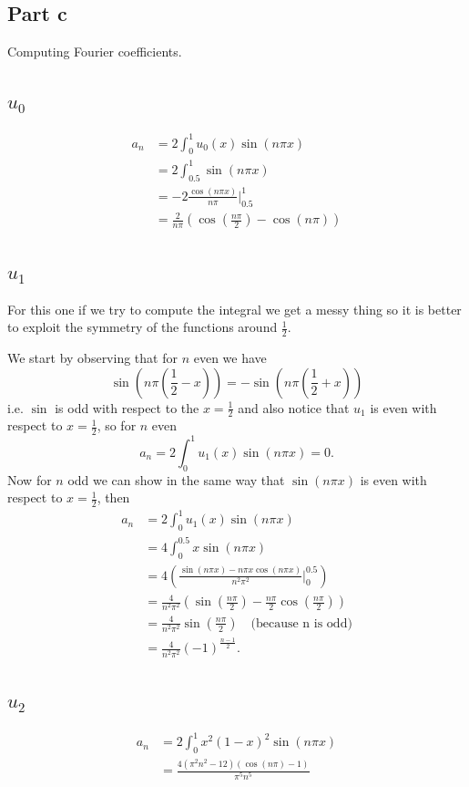\documentclass{article}
\begin{document}
\subsection{Part c}
Computing Fourier coefficients.
\subsection{$u_0$}
\begin{align*}
	a_n&=2\int_0^1 u_0(x)\sin(n\pi x)\\
	  &=2\int_{0.5}^1\sin(n\pi x)\\
	  &= -2\frac{\cos(n\pi x)}{n\pi}\Big|_{0.5}^1\\
	  &= \frac{2}{n\pi}\left(\cos\left(\frac{n\pi}{2}\right)-\cos(n\pi)\right)
\end{align*}
\subsection{$u_1$}
For this one if we try to compute the integral we get a messy thing so it is
better to exploit the symmetry of the functions around $\frac{1}{2}$.

We start by observing that for $n$ even we have
\[
\sin\left(n\pi \left(\frac{1}{2}-x\right)\right)=-\sin\left(n\pi \left(\frac{1}{2}+x\right)\right)
\]
i.e. $\sin$ is odd with respect to the
$x=\frac{1}{2}$ and also notice that $u_1$ is even with respect to
$x=\frac{1}{2}$, so for $n$ even
\[
a_n=2\int_0^1 u_1(x)\sin(n\pi x)=0.
\]
Now for $n$ odd we can show in the same way that $\sin(n\pi x)$ is even with
respect to $x=\frac{1}{2}$, then
\begin{align*}
	a_n&=2\int_0^1 u_1(x)\sin(n\pi x)\\
	  &=4\int_0^{0.5}x\sin(n\pi x)\\
	  &=4\left(\frac{\sin(n\pi x)-n\pi x\cos(n\pi x)}{n^2\pi^2}\Big|_0^{0.5}\right)\\
	  &=\frac{4}{n^2\pi^2}\left(\sin\left(\frac{n\pi}{2}\right)-\frac{n\pi}{2}\cos\left(\frac{n\pi}{2}\right)\right)\\
	  &=\frac{4}{n^2\pi^2}\sin\left(\frac{n\pi}{2}\right) \quad \text{(because n is odd)}\\
	  &=\frac{4}{n^2\pi^2}(-1)^{\frac{n-1}{2}}.
\end{align*}
\subsection{$u_2$}
\begin{align*}
	a_n&=2\int_0^1 x^2(1-x)^2\sin(n\pi x)\\
	   &=\frac{4(\pi^2 n^2-12)(\cos(n\pi)-1)}{\pi^5n^5}
\end{align*}
\end{document}
